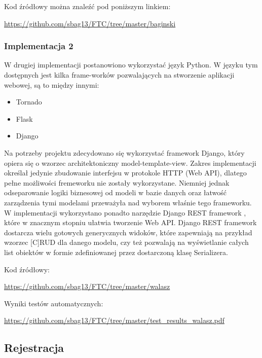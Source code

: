 \documentclass[12pt, notitlepage]{article}
\begin{document}
Kod źródłowy można znaleźć pod poniższym linkiem:\\
\centerline{\url{https://github.com/sbag13/FTC/tree/master/baginski}}

\subsubsection{Implementacja 2}

W drugiej implementacji postanowiono wykorzystać język Python. W języku tym dostępnych jest kilka frame-worków pozwalających na stworzenie aplikacji webowej, są to między innymi:
\begin{itemize}
    \item Tornado
    \item Flask
    \item Django
\end{itemize}

Na potrzeby projektu zdecydowano się wykorzystać framework Django, który opiera się o wzorzec architektoniczny model-template-view. Zakres implementacji określał jedynie zbudowanie interfejsu w protokole HTTP (Web API), dlatego pełne możliwości fremeworku nie zostały wykorzystane. Niemniej jednak odseparowanie logiki biznesowej od modeli w bazie danych oraz łatwość zarządzenia tymi modelami przeważyła nad wyborem właśnie tego frameworku. W implementacji wykorzystano ponadto narzędzie Django REST framework \cite{django_rest_framework}, które w znacznym stopniu ułatwia tworzenie Web API. Django REST framework dostarcza wielu gotowych generycznych widoków, które zapewniają na przykład wzorzec [C]RUD dla danego modelu, czy też pozwalają na wyświetlanie całych list obiektów w formie zdefiniowanej przez dostarczoną klasę Serializera.

Kod źródłowy: \\
\centerline{\url{https://github.com/sbag13/FTC/tree/master/walasz}}

Wyniki testów automatycznych: \\
\centerline{\url{https://github.com/sbag13/FTC/tree/master/test_results_walasz.pdf}}

\subsection{Rejestracja} \label{sec:rejestracja}
\end{document}
